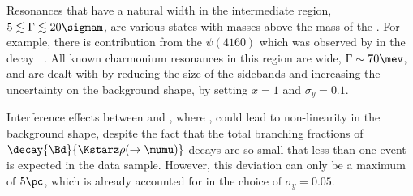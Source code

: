 Resonances that have a natural width in the intermediate region, $5\lesssim\Gamma\lesssim20\sigmam$, are
various \ccbar states with masses above the mass of the \psitwos.
For example, there is contribution from the $\psi(4160)$ which was observed by \lhcb in the decay
\decay{\Bp}{\Kp\mumu}~\cite{LHCb-PAPER-2013-039}.
All known charmonium resonances in this region are wide,
$\Gamma\sim70\mev$, and are dealt with by reducing the size of the sidebands and increasing the
uncertainty on the background shape, by setting $x=1$ and $\sigma_y=0.1$.



Interference effects between
\btokstrmumu and \decay{\Bd}{\Kstarz\rho}, where \decay{\rho}{\mumu}, could lead to non-linearity
in the background shape, despite the fact that the total branching fractions of
$\decay{\Bd}{\Kstarz\rho(\to\mumu)}$ decays are so small that less than one event is expected in the
data sample.
However, this deviation can only be a maximum of \approx$5\pc$, which is already accounted for in
the choice of $\sigma_y=0.05$.

